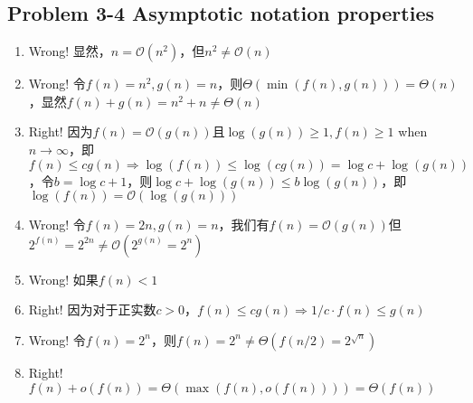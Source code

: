 \subsection*{Problem 3-4 Asymptotic notation properties}
\begin{enumerate}
	\item	Wrong! 显然，$n = \mathcal{O}(n^2)$，但$n^2 \neq \mathcal{O}(n)$
	\item	Wrong! 令$f(n)=n^2, g(n)=n$，则$\Theta(\min(f(n),g(n)))=\Theta(n)$，显然$f(n)+g(n)=n^2+n \neq \Theta(n)$
	\item	Right! 因为$f(n)=\mathcal{O}(g(n))$且$\log(g(n)) \geq 1, f(n) \geq 1$ when $n \rightarrow \infty$，即$f(n) \leq cg(n) \Rightarrow \log(f(n)) \leq \log(cg(n))=\log c+\log(g(n))$，令$b=\log c + 1$，则$\log c+\log(g(n)) \leq b\log(g(n))$，即$\log(f(n))=\mathcal{O}(\log(g(n)))$
	\item	Wrong! 令$f(n)=2n, g(n)=n$，我们有$f(n)=\mathcal{O}(g(n))$但$2^{f(n)}=2^{2n} \neq \mathcal{O}(2^{g(n)} = 2^n)$
	\item	Wrong! 如果$f(n) < 1$
	\item	Right! 因为对于正实数$c > 0$，$f(n) \leq cg(n) \Rightarrow 1/c \cdot f(n) \leq g(n)$
	\item	Wrong! 令$f(n)=2^n$，则$f(n)=2^n \neq \Theta(f(n/2) = 2^{\sqrt n})$
	\item	Right! $f(n) + o(f(n))=\Theta(\max(f(n), o(f(n))))=\Theta(f(n))$
\end{enumerate}

